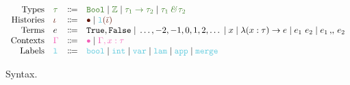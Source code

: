 \documentclass[a4paper,landscape]{article}
\newcommand{\boldcdot}{\bullet}
\newcommand{\bool}{\texttt{Bool}}
\newcommand{\integer}{\mathbb{Z}}
\newcommand{\intersectionop}{\, \textit{\&} \,}
\newcommand{\true}{\texttt{True}}
\newcommand{\false}{\texttt{False}}
\newcommand{\lam}[2]{\lambda ({#1}) \to {#2}}
\newcommand{\app}[2]{{#1} ~ {#2}}
\newcommand{\mergeop}{\, ,\!, \,}
\newcommand{\typecolor}[1]{\textcolor{OliveGreen}{#1}}
\newcommand{\contextcolor}[1]{\textcolor{CarnationPink}{#1}}
\newcommand{\derivcolor}[1]{\textcolor{Sepia}{#1}}
\newcommand{\blackmid}{\textcolor{black}{\; \mid \;}}
\newcommand{\labelcolor}[1]{\textcolor{SkyBlue}{\mathtt{#1}}}
\begin{document}
\begin{figure}
    \[
        \begin{array}{rlrl}
            \textrm{Types}     & \typecolor{\tau}      & \Coloneqq & \typecolor{\bool \blackmid \integer \blackmid \tau_1 \to \tau_2 \blackmid \tau_1 \intersectionop \tau_2} \\
            \textrm{Histories} & \derivcolor{\iota}    & \Coloneqq & \derivcolor{\boldcdot \blackmid \labelcolor{l} (\bar{\iota})} \\
            \textrm{Terms}     & e                     & \Coloneqq & \true, \false \blackmid \ldots, -2, -1, 0, 1, 2, \ldots \blackmid x \blackmid \lam {x : \tau} {e} \blackmid \app {e_1} {e_2} \blackmid e_1 \mergeop e_2 \\
            \textrm{Contexts}  & \contextcolor{\Gamma} & \Coloneqq & \contextcolor{\boldcdot \blackmid \Gamma, x : \tau} \\
            \textrm{Labels}    & \labelcolor{l}        & \Coloneqq & \labelcolor{bool} \blackmid \labelcolor{int} \blackmid \labelcolor{var} \blackmid \labelcolor{lam} \blackmid \labelcolor{app} \blackmid \labelcolor{merge}
        \end{array}
    \]
    \caption{Syntax.}
\end{figure}
\end{document}
